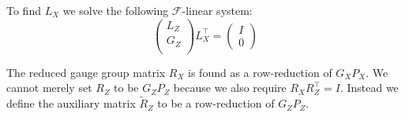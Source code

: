 \documentclass[11pt,oneside]{article}
\newcommand{\Field}{\mathcal{F}}
\begin{document}
To find $L_X$ we solve the following $\Field$-linear
system:
$$
\left( \begin{array}{l}
L_Z\\
G_Z\\
\end{array} \right)
L_X^\top = 
\left( \begin{array}{l}
I\\
0
\end{array} \right)
$$

The reduced gauge group matrix $R_X$
is found as a row-reduction of $G_X P_X.$
We cannot merely set $R_Z$ to be $G_Z P_Z$ 
because we also require $R_X R_Z^\top = I.$
Instead we define the auxiliary matrix
$\widetilde{R}_Z$ to be a row-reduction of  $G_Z P_Z.$
\end{document}
